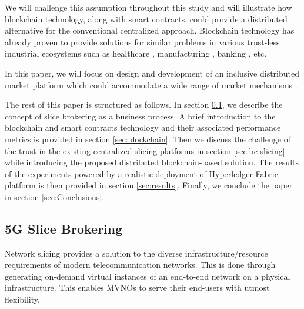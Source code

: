 We will challenge this assumption throughout this study and will illustrate how blockchain technology, along with smart contracts, could provide a distributed alternative for the conventional centralized approach. Blockchain technology has already proven to provide solutions for similar problems in various trust-less industrial ecosystems such as healthcare \cite{mettler2016blockchain}, manufacturing \cite{abeyratne2016blockchain}, banking \cite{guo2016blockchain}, etc.

In this paper, %
we will focus on design and development of an inclusive distributed market platform which could accommodate a wide range of market mechanisms \cite{8480631}.%


The rest of this paper is structured as follows. In section \ref{sec:slicing}, we describe the concept of slice brokering as a business process. A brief introduction to the blockchain and smart contracts technology and their associated performance metrics is provided in section \ref{sec:blockchain}. Then we discuss the challenge of the trust in the existing centralized slicing platforms in section \ref{sec:bc-slicing} while introducing the proposed distributed blockchain-based solution. The results of the experiments powered by a realistic deployment of Hyperledger Fabric platform is then provided in section \ref{sec:results}. Finally, we conclude the paper in section \ref{sec:Conclusions}.


\subsection{5G Slice Brokering}
\label{sec:slicing}

Network slicing provides a solution to the diverse infrastructure/resource requirements of modern telecommunication networks. This is done through generating on-demand virtual instances of an end-to-end network on a physical infrastructure. This enables \acp{MVNO} to serve their end-users with utmost flexibility. 

